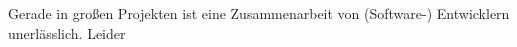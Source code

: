 \documentclass{article}
\begin{document}
Gerade in großen Projekten ist eine Zusammenarbeit von (Software-) Entwicklern unerlässlich. Leider
\end{document}

